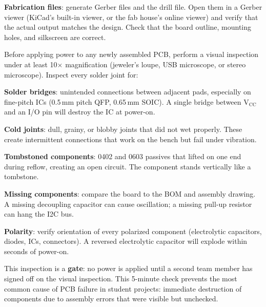 \textbf{Fabrication files}: generate Gerber files and the drill file. Open them in a Gerber viewer (KiCad's built-in viewer, or the fab house's online viewer) and verify that the actual output matches the design. Check that the board outline, mounting holes, and silkscreen are correct.
\begin{keyconceptbox}
Before applying power to any newly assembled PCB, perform a visual inspection under at least 10$\times$ magnification (jeweler's loupe, USB microscope, or stereo microscope). Inspect every solder joint for:

\textbf{Solder bridges}: unintended connections between adjacent pads, especially on fine-pitch ICs (0.5\,mm pitch QFP, 0.65\,mm SOIC). A single bridge between V$_{\text{CC}}$ and an I/O pin will destroy the IC at power-on.

\textbf{Cold joints}: dull, grainy, or blobby joints that did not wet properly. These create intermittent connections that work on the bench but fail under vibration.

\textbf{Tombstoned components}: 0402 and 0603 passives that lifted on one end during reflow, creating an open circuit. The component stands vertically like a tombstone.

\textbf{Missing components}: compare the board to the BOM and assembly drawing. A missing decoupling capacitor can cause oscillation; a missing pull-up resistor can hang the I2C bus.

\textbf{Polarity}: verify orientation of every polarized component (electrolytic capacitors, diodes, ICs, connectors). A reversed electrolytic capacitor will explode within seconds of power-on.

This inspection is a \textbf{gate}: no power is applied until a second team member has signed off on the visual inspection. This 5-minute check prevents the most common cause of PCB failure in student projects: immediate destruction of components due to assembly errors that were visible but unchecked.
\end{keyconceptbox}

